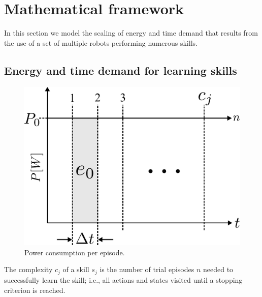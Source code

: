 \section{Mathematical framework}\label{sec:transfer_learning}
In this section we model the scaling of energy and time demand that results from the use of a set of multiple robots performing numerous skills.

\subsection{Energy and time demand for learning skills}
\begin{figure}[!ht]
	\centering
	\includegraphics[width=0.95\columnwidth]{fig/power_per_episode.pdf}
	\caption{Power consumption per episode.}
	\label{fig:power_per_episode}
\end{figure}
\begin{tcolorbox}
	\begin{definition}\label{definition:complexity}
		The complexity $c_j$ of a skill $ s_j $  is the number of trial episodes $n$ needed to successfully learn the skill; i.e., all actions and states visited until a stopping criterion is reached. 
	\end{definition}
\end{tcolorbox}

